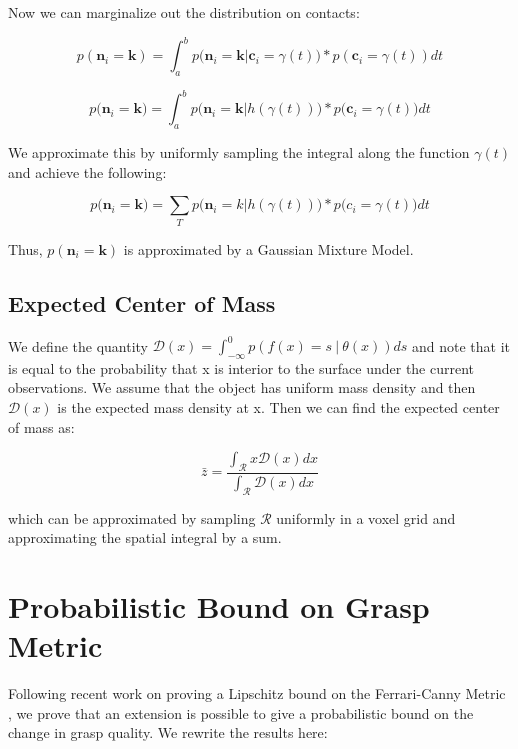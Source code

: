 \documentclass[letterpaper, 10 pt, conference]{ieeeconf}  %
\begin{document}
Now we can marginalize out the distribution on contacts:

\begin{equation}
p(\textbf{n}_i = \textbf{k}) = \int_a^b  p \big(\textbf{n}_i = \textbf{k} | \textbf{c}_i = \gamma(t) \big)*p(\textbf{c}_i = \gamma(t)) dt
\end{equation}

\begin{equation}
p\big(\textbf{n}_i = \textbf{k}\big) = \int_a^b  p \big(\textbf{n}_i = \textbf{k} | h(\gamma(t))\big)*p\big(\textbf{c}_i = \gamma(t)\big) dt
\end{equation}

We approximate this by uniformly sampling the integral along the function $\gamma(t)$ and achieve the following: 

\begin{equation}
p\big( \textbf{n}_i = \textbf{k} \big) = \sum_T  p \big( \textbf{n}_i = k | h(\gamma(t)) \big) *p\big(c_i = \gamma(t)\big) dt
\end{equation}


Thus, $p(\textbf{n}_i = \textbf{k})$ is approximated by a Gaussian Mixture Model.

\subsection{Expected Center of Mass} 

We define the quantity $\mathcal{D}(x) = \int_{-\infty}^{0} p(f(x) =  s \ | \ \theta(x)) ds$ and note that it is equal to the probability that x is interior to the surface under the current observations.
We assume that the object has uniform mass density and then $\mathcal{D}(x)$ is the expected mass density at x.
Then we can find the expected center of mass as:

\begin{equation}
  \bar{z} 
  =
  \frac
    {\int_{\mathcal{R}}x \mathcal{D}(x) dx}
    {\int_{\mathcal{R}}  \mathcal{D}(x) dx}
\end{equation}

which can be approximated by sampling $\mathcal{R}$ uniformly in a voxel grid and approximating the spatial integral by a sum.


\section{Probabilistic Bound on Grasp Metric}
\label{sec:bound}
Following recent work on proving a Lipschitz bound on the Ferrari-Canny Metric \cite{pokorny2013classical}, we prove that an extension is possible to give a probabilistic bound on the change in grasp quality.
We rewrite the results here:
\end{document}
